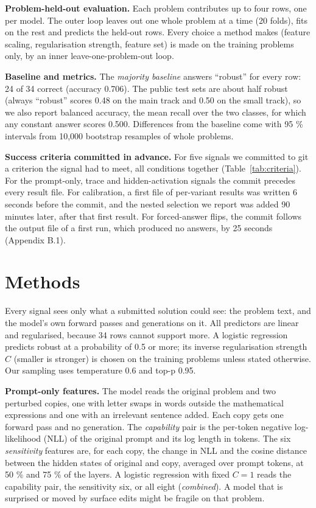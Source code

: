 \documentclass{article}
\begin{document}
\textbf{Problem-held-out evaluation.} Each problem contributes up to four rows, one per model. The outer loop leaves out one whole problem at a time (20 folds), fits on the rest and predicts the held-out rows. Every choice a method makes (feature scaling, regularisation strength, feature set) is made on the training problems only, by an inner leave-one-problem-out loop.

\textbf{Baseline and metrics.} The \emph{majority baseline} answers ``robust'' for every row: 24 of 34 correct (accuracy 0.706). The public test sets are about half robust (always ``robust'' scores 0.48 on the main track and 0.50 on the small track), so we also report balanced accuracy, the mean recall over the two classes, for which any constant answer scores 0.500. Differences from the baseline come with 95 \% intervals from 10,000 bootstrap resamples of whole problems.

\textbf{Success criteria committed in advance.} For five signals we committed to git a criterion the signal had to meet, all conditions together (Table~\ref{tab:criteria}). For the prompt-only, trace and hidden-activation signals the commit precedes every result file. For calibration, a first file of per-variant results was written 6 seconds before the commit, and the nested selection we report was added 90 minutes later, after that first result. For forced-answer flips, the commit follows the output file of a first run, which produced no answers, by 25 seconds (Appendix B.1).

\section{Methods}

Every signal sees only what a submitted solution could see: the problem text, and the model's own forward passes and generations on it. All predictors are linear and regularised, because 34 rows cannot support more. A logistic regression predicts robust at a probability of 0.5 or more; its inverse regularisation strength $C$ (smaller is stronger) is chosen on the training problems unless stated otherwise. Our sampling uses temperature 0.6 and top-p 0.95.

\textbf{Prompt-only features.} The model reads the original problem and two perturbed copies, one with letter swaps in words outside the mathematical expressions and one with an irrelevant sentence added. Each copy gets one forward pass and no generation. The \emph{capability} pair is the per-token negative log-likelihood (NLL) of the original prompt and its log length in tokens. The six \emph{sensitivity} features are, for each copy, the change in NLL and the cosine distance between the hidden states of original and copy, averaged over prompt tokens, at 50 \% and 75 \% of the layers. A logistic regression with fixed $C = 1$ reads the capability pair, the sensitivity six, or all eight (\emph{combined}). A model that is surprised or moved by surface edits might be fragile on that problem.
\end{document}

